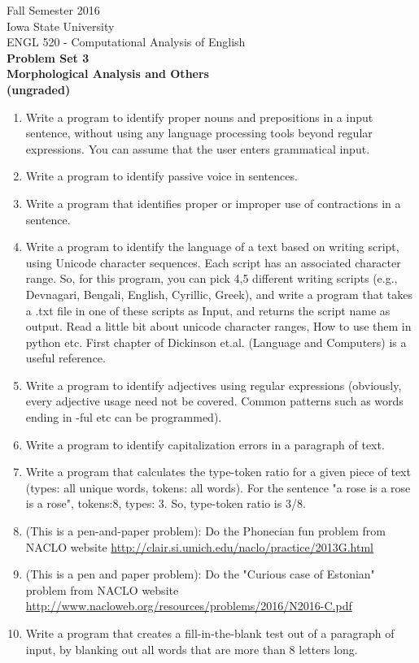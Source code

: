 \documentclass[11pt,a4paper]{article}
\begin{document}
\begin{center}
  Fall Semester 2016 \\ Iowa State University\\[3ex]
  {\large ENGL 520 - Computational Analysis of English}\\[3ex]
  \textbf{Problem Set 3} \\ \textbf{Morphological Analysis and Others \\ (ungraded)}
\end{center}

\begin{enumerate}
\item Write a program to identify proper nouns and prepositions in a input sentence, without using any language processing tools beyond regular expressions. You can assume that the user enters grammatical input.
\item Write a program to identify passive voice in sentences. 
\item Write a program that identifies proper or improper use of contractions in a sentence.
\item Write a program to identify the language of a text based on writing script, using Unicode character sequences. Each script has an associated character range. So, for this program, you can pick 4,5 different writing scripts (e.g., Devnagari, Bengali, English, Cyrillic, Greek), and write a program that takes a .txt file in one of these scripts as Input, and returns the script name as output. Read a little bit about unicode character ranges, How to use them in python etc. First chapter of Dickinson et.al. (Language and Computers) is a useful reference. 
\item Write a program to identify adjectives using regular expressions (obviously, every adjective usage need not be covered. Common patterns such as words ending in -ful etc can be programmed).
\item Write a program to identify capitalization errors in a paragraph of text.
\item Write a program that calculates the type-token ratio for a given piece of text (types: all unique words, tokens: all words). For the sentence "a rose is a rose is a rose", tokens:8, types: 3. So, type-token ratio is 3/8.
\item (This is a pen-and-paper problem): Do the Phonecian fun problem from NACLO website \url{http://clair.si.umich.edu/naclo/practice/2013G.html}
\item (This is a pen and paper problem): Do the "Curious case of Estonian" problem from NACLO website \url{http://www.nacloweb.org/resources/problems/2016/N2016-C.pdf}
\item Write a program that creates a fill-in-the-blank test out of a paragraph of input, by blanking out all words that are more than 8 letters long.
\end{enumerate}
\end{document}

